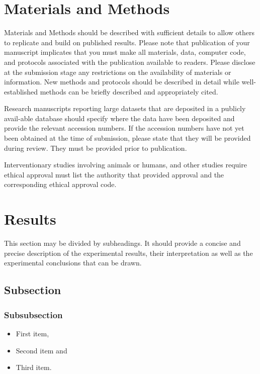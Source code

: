 \documentclass[article,english]{stucosrec}
\begin{document}
    \section{Materials and Methods}
    
    Materials and Methods should be described with sufficient details to allow others to replicate and build on published results.
    Please note that publication of your manuscript implicates that you must make all materials, data, computer code, and protocols associated with the publication available to readers.
    Please disclose at the submission stage any restrictions on the availability of materials or information.
    New methods and protocols should be described in detail while well-established methods can be briefly described and appropriately cited.
    
    Research manuscripts reporting large datasets that are deposited in a publicly avail-able database should specify where the data have been deposited and provide the relevant accession numbers.
    If the accession numbers have not yet been obtained at the time of submission, please state that they will be provided during review.
    They must be provided prior to publication.
    
    Interventionary studies involving animals or humans, and other studies require ethical approval must list the authority that provided approval and the corresponding ethical approval code.
    
    \section{Results}
    
    This section may be divided by subheadings.
    It should provide a concise and precise description of the experimental results, their interpretation as well as the experimental conclusions that can be drawn.
    
    \subsection{Subsection}
    
    \subsubsection{Subsubsection}
    
    \begin{itemize}
		\item First item,
		\item Second item and
		\item Third item.
	\end{itemize}
	
\end{document}
